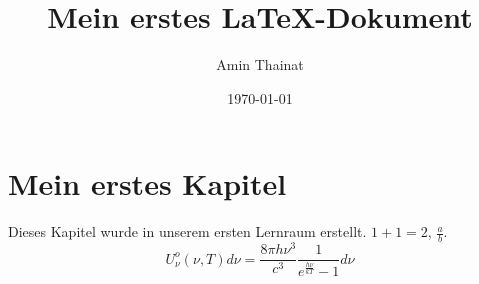 \documentclass[]{article}
\title{Mein erstes \LaTeX-Dokument}
\author{Amin Thainat}
\date{\today}
\begin{document}
	\maketitle
	\tableofcontents
\section{Mein erstes Kapitel}
Dieses Kapitel wurde in unserem ersten Lernraum erstellt. 
$1+1=2$, $\frac{a}{b}$.
\begin{equation}
	U_{\nu}^{o}(\nu,T)d\nu
	=
	\frac{8\pi h\nu^3}{c^3}
	\frac{1}{e^{\frac{h\nu}{kT}}-1}d\nu
\end{equation}
\end{document}
